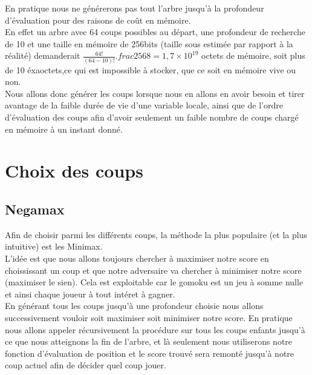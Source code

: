 \documentclass{article}
\begin{document}
En pratique nous ne générerons pas tout l'arbre jusqu'à la profondeur d'évaluation pour des raisons de coût en mémoire.\\
En effet un arbre avec 64 coups possibles au départ, une profondeur de recherche de 10 et une taille en mémoire de 256bits
(taille sous estimée par rapport à la réalité) demanderait $ \frac{64!}{(64-10)!}.frac{256}{8} = 1,7\times 10^{19}$ octets de mémoire, 
soit plus de 10 éxaoctets,ce qui est impossible à stocker, que ce soit en mémoire vive ou non.\\
Nous allons donc générer les coups lorsque nous en allons en avoir besoin et tirer avantage de la faible durée de vie d'une variable locale, ainsi
que de l'ordre d'évaluation des coups afin d'avoir seulement un faible nombre de coups chargé en mémoire à un instant donné.

\pagebreak
\section{Choix des coups}
\subsection{Negamax}

Afin de choisir parmi les différents coups, la méthode la plus populaire (et la plus intuitive) est les Minimax.\\
L'idée est que nous allons toujours chercher à maximiser notre score en choississant un coup et que notre
adversaire va chercher à minimiser notre score (maximiser le sien). Cela est exploitable car le gomoku est un jeu
à somme nulle et ainsi chaque joueur à tout intéret à gagner.\\
En générant tous les coups jusqu'à une profondeur choisie nous allons successivement vouloir soit maximiser soit minimiser
notre score. En pratique nous allons appeler récursivement la procédure sur tous les coups enfants jusqu'à ce que nous
atteignons la fin de l'arbre, et là seulement nous utiliserons notre fonction d'évaluation de position et le score 
trouvé sera remonté jusqu'à notre coup actuel afin de décider quel coup jouer.\\
\end{document}
